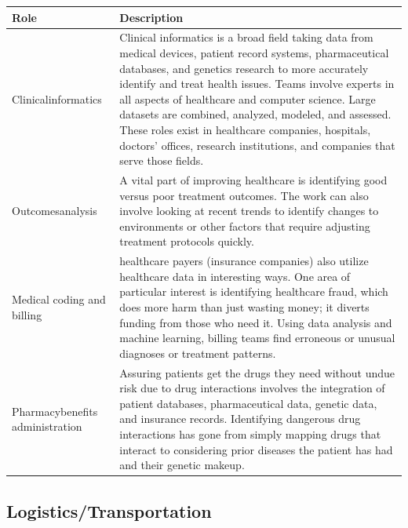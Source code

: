 \begin{table}[H]
	\begin{center}
		\begin{tabular}{p{1in}|p{3.4in}} 
			\textbf{Role} & \textbf{Description}\\
			\hline
			Clinical\linebreak informatics & Clinical informatics is a broad field taking data from medical devices, patient record systems, pharmaceutical databases, and genetics research to more accurately identify and treat health issues. Teams involve experts in all aspects of healthcare and computer science. Large datasets are combined, analyzed, modeled, and assessed. These roles exist in healthcare companies, hospitals, doctors' offices, research institutions, and companies that serve those fields.\\
			\hline
			Outcomes\linebreak analysis & A vital part of improving healthcare is identifying good versus poor treatment outcomes. The work can also involve looking at recent trends to identify changes to environments or other factors that require adjusting treatment protocols quickly.\\
			\hline
			Medical coding and billing & healthcare payers (insurance companies) also utilize healthcare data in interesting ways. One area of particular interest is identifying healthcare fraud, which does more harm than just wasting money; it diverts funding from those who need it. Using data analysis and machine learning, billing teams find erroneous or unusual diagnoses or treatment patterns.\\
			\hline
			Pharmacy\linebreak benefits administration & Assuring patients get the drugs they need without undue risk due to drug interactions involves the integration of patient databases, pharmaceutical data, genetic data, and insurance records. Identifying dangerous drug interactions has gone from simply mapping drugs that interact to considering prior diseases the patient has had and their genetic makeup.\\
			\hline
		\end{tabular}
	\end{center}
\end{table}

\subsection{Logistics/Transportation}


